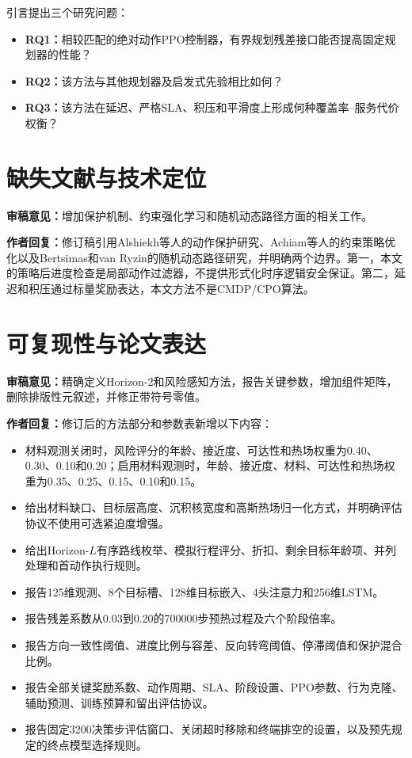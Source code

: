 \documentclass[UTF8,fontset=none]{ctexart}
\newcommand{\reviewcomment}[1]{\par\noindent\textbf{审稿意见：}#1\par}
\newcommand{\authorresponse}[1]{\par\noindent\textbf{作者回复：}#1\par}
\begin{document}
引言提出三个研究问题：
\begin{itemize}
  \item \textbf{RQ1：}相较匹配的绝对动作PPO控制器，有界规划残差接口能否提高固定规划器的性能？
  \item \textbf{RQ2：}该方法与其他规划器及启发式先验相比如何？
  \item \textbf{RQ3：}该方法在延迟、严格SLA、积压和平滑度上形成何种覆盖率--服务代价权衡？
\end{itemize}

\section{缺失文献与技术定位}
\reviewcomment{增加保护机制、约束强化学习和随机动态路径方面的相关工作。}

\authorresponse{修订稿引用Alshiekh等人的动作保护研究、Achiam等人的约束策略优化以及Bertsimas和van Ryzin的随机动态路径研究，并明确两个边界。第一，本文的策略后进度检查是局部动作过滤器，不提供形式化时序逻辑安全保证。第二，延迟和积压通过标量奖励表达，本文方法不是CMDP/CPO算法。}

\section{可复现性与论文表达}
\reviewcomment{精确定义Horizon-2和风险感知方法，报告关键参数，增加组件矩阵，删除排版性元叙述，并修正带符号零值。}

\authorresponse{修订后的方法部分和参数表新增以下内容：}
\begin{itemize}
  \item 材料观测关闭时，风险评分的年龄、接近度、可达性和热场权重为0.40、0.30、0.10和0.20；启用材料观测时，年龄、接近度、材料、可达性和热场权重为0.35、0.25、0.15、0.10和0.15。
  \item 给出材料缺口、目标层高度、沉积核宽度和高斯热场归一化方式，并明确评估协议不使用可选紧迫度增强。
  \item 给出Horizon-$L$有序路线枚举、模拟行程评分、折扣、剩余目标年龄项、并列处理和首动作执行规则。
  \item 报告125维观测、8个目标槽、128维目标嵌入、4头注意力和256维LSTM。
  \item 报告残差系数从0.03到0.20的700000步预热过程及六个阶段倍率。
  \item 报告方向一致性阈值、进度比例与容差、反向转弯阈值、停滞阈值和保护混合比例。
  \item 报告全部关键奖励系数、动作周期、SLA、阶段设置、PPO参数、行为克隆、辅助预测、训练预算和留出评估协议。
  \item 报告固定3200决策步评估窗口、关闭超时移除和终端排空的设置，以及预先规定的终点模型选择规则。
\end{itemize}
\end{document}
